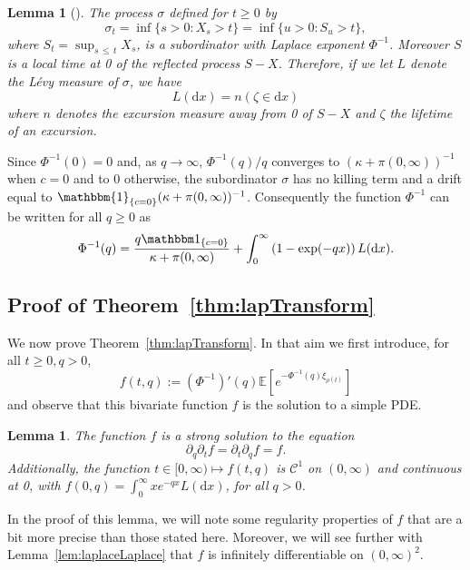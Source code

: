 \documentclass[10pt]{amsart}
\newtheorem{lemm}[theo]{Lemma}
\theoremstyle{definition}
\numberwithin{equation}{section}
\newcommand{\bbE}{\mathbb{E}}
\newcommand{\dd}{\mathrm{d}}
\newcommand{\calC}{\mathcal{C}}
\newcommand{\ind}[1]{\mathbbm{1}_{\left\{#1\right\}}}
\begin{document}
\begin{lemm}[{\cite[Theorem~1, Chapter~VII]{BLevy}}]
The process $\sigma$ defined for $t \geq 0$ by
\[
\sigma_t = \inf\{ s > 0 : X_s > t\}=\inf\{ u >0:S_u>t\},
\]
where $S_t = \sup_{s\,\leq\,t} X_s$, is a subordinator with Laplace exponent $\Phi^{-1}$. Moreover $S$ is a local time at 0 of the reflected process $S-X$. Therefore, if we let $L$ denote the Lévy measure of $\sigma$, we have
\[
L(\dd x)=n(\zeta \in \dd x)
\]
where $n$ denotes the excursion measure away from 0 of $S-X$ and $\zeta$ the lifetime of an excursion.
\end{lemm}



Since $\Phi^{-1}(0)=0$ and, as $q\rightarrow \infty$, $\Phi^{-1}(q)/q$ converges to $(\kappa+\pi(0,\infty))^{-1}$ when $c=0$ and to $0$ otherwise, the subordinator $\sigma$ has no killing term and a drift equal to $\ind{c=0}(\kappa+\pi(0,\infty))^{-1}$. Consequently the function $\Phi^{-1}$ can be written for all $q\geq 0$ as
\begin{equation}\label{LK_invPhi}
\Phi^{-1}(q)=\frac{q \mathbbm 1_{\{c=0\}}}{\kappa+\pi(0,\infty)}+\int_0^{\infty} \left(1-\exp(-qx)\right)L(\dd x).
\end{equation}

\subsection{Proof of Theorem~\ref{thm:lapTransform}}\label{sec:proofThmain}

We now prove Theorem~\ref{thm:lapTransform}. In that aim we first introduce, for all $t \geq 0, q>0$,
\begin{equation}\label{def:f}
f(t,q):=(\Phi^{-1})'(q)\bbE\left[e^{-\Phi^{-1}(q) \xi_{\rho(t)}}\right]
\end{equation}
and observe that this bivariate function $f$ is the solution to a simple PDE.

\begin{lemm}\label{lem:easy}
The function $f$ is a strong solution to the equation
\begin{equation}\label{eq:easy}
\partial_q \partial_t f = \partial_t \partial_q f= f.
\end{equation}
Additionally, the function $t \in [0,\infty) \mapsto f(t,q)$ is $\calC^1$ on $(0,\infty)$ and continuous at 0, with $f(0,q)=\int_0^{\infty}xe^{-qx}L(\dd x)$, for all $q>0$.
\end{lemm}

In the proof of this lemma, we will note some regularity properties of $f$ that are a bit more precise than those stated here. Moreover, we will see further with Lemma~\ref{lem:laplaceLaplace} that $f$ is infinitely differentiable on $(0,\infty)^2$.
\end{document}
